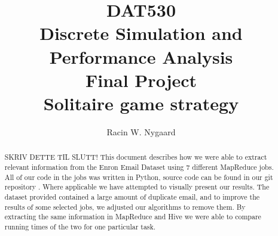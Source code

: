\documentclass[runningheads,a4paper]{llncs}
\begin{document}
\mainmatter  %

\title{DAT530\\Discrete Simulation and Performance Analysis\\Final Project\\Solitaire game strategy}


%
%
\author{Racin W. Nygaard}%

%


%
%

\maketitle


\begin{abstract}
SKRIV DETTE TIL SLUTT!
This document describes how we were able to extract relevant information from the Enron Email Dataset using 7 different MapReduce jobs. All of our code in the jobs was written in Python, source code can be found in our git repository \cite{git}. Where applicable we have attempted to visually present our results.
\newline
The dataset provided contained a large amount of duplicate email, and to improve the results of some selected jobs, we adjusted our algorithms to remove them.
\newline
By extracting the same information in MapReduce and Hive we were able to compare running times of the two for one particular task.
\end{abstract}
\end{document}
